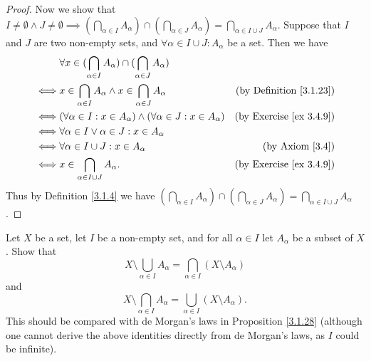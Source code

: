 \begin{proof}
    Now we show that \(I \neq \emptyset \land J \neq \emptyset \implies (\bigcap_{\alpha \in I} A_{\alpha}) \cap (\bigcap_{\alpha \in J} A_{\alpha}) = \bigcap_{\alpha \in I \cup J} A_{\alpha}\).
    Suppose that \(I\) and \(J\) are two non-empty sets, and \(\forall \alpha \in I \cup J : A_{\alpha}\) be a set.
    Then we have
    \begin{align*}
             & \forall x \in (\bigcap_{\alpha \in I} A_{\alpha}) \cap (\bigcap_{\alpha \in J} A_{\alpha})                                       \\
        \iff & x \in \bigcap_{\alpha \in I} A_{\alpha} \land x \in \bigcap_{\alpha \in J} A_{\alpha}      & \text{(by Definition \ref{3.1.23})} \\
        \iff & (\forall \alpha \in I : x \in A_{\alpha}) \land (\forall \alpha \in J : x \in A_{\alpha})  & \text{(by Exercise \ref{ex 3.4.9})} \\
        \iff & \forall \alpha \in I \lor \alpha \in J : x \in A_{\alpha}                                                                        \\
        \iff & \forall \alpha \in I \cup J : x \in A_{\alpha}                                             & \text{(by Axiom \ref{3.4})}         \\
        \iff & x \in \bigcap_{\alpha \in I \cup J} A_{\alpha}.                                            & \text{(by Exercise \ref{ex 3.4.9})}
    \end{align*}
    Thus by Definition \ref{3.1.4} we have \((\bigcap_{\alpha \in I} A_{\alpha}) \cap (\bigcap_{\alpha \in J} A_{\alpha}) = \bigcap_{\alpha \in I \cup J} A_{\alpha}\).
\end{proof}

\begin{exercise}\label{ex 3.4.11}
    Let \(X\) be a set, let \(I\) be a non-empty set, and for all \(\alpha \in I\) let \(A_{\alpha}\) be a subset of \(X\).
    Show that
    \[
        X \setminus \bigcup_{\alpha \in I} A_{\alpha} = \bigcap_{\alpha \in I} (X \setminus A_{\alpha})
    \]
    and
    \[
        X \setminus \bigcap_{\alpha \in I} A_{\alpha} = \bigcup_{\alpha \in I} (X \setminus A_{\alpha}).
    \]
    This should be compared with de Morgan's laws in Proposition \ref{3.1.28}
    (although one cannot derive the above identities directly from de Morgan's laws, as \(I\) could be infinite).
\end{exercise}

